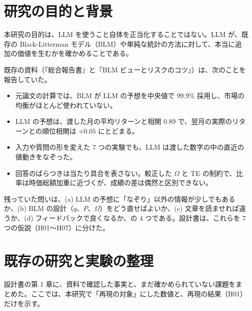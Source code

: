 \documentclass[xelatex,ja=standard,jafont=haranoaji,a4paper,10pt,openany]{bxjsreport}
\begin{document}
\setcounter{tocdepth}{1}
{\small\tableofcontents}

\chapter{研究の目的と背景}\label{ch:intro}

本研究の目的は、LLM を使うこと自体を正当化することではない。LLM が、既存の Black-Litterman モデル（BLM）や単純な統計の方法に対して、本当に追加の価値を生むかを確かめることである。

既存の資料（『総合報告書』と『BLM ビューとリスクのコツ』）は、次のことを報告していた。

\begin{itemize}
\item 元論文の計算では、BLM が LLM の予想を中央値で 99.9\% 採用し、市場の均衡がほとんど使われていない。
\item LLM の予想は、渡した月の平均リターンと相関 0.89 で、翌月の実際のリターンとの順位相関は $+0.05$ にとどまる。
\item 入力や質問の形を変えた 7 つの実験でも、LLM は渡した数字の中の直近の値動きをなぞった。
\item 回答のばらつきは当たり具合を表さない。較正した $\Omega$ と TE の制約で、比率は時価総額加重に近づくが、成績の差は偶然と区別できない。
\end{itemize}

残っていた問いは、(a) LLM の予想に「なぞり」以外の情報が少しでもあるか、(b) BLM の設計（$q$、$P$、$\Omega$）をどう直せばよいか、(c) 文章を読ませれば違うか、(d) フィードバックで良くなるか、の 4 つである。設計書は、これらを 7 つの仮説（H01〜H07）に分けた。

\chapter{既存の研究と実験の整理}\label{ch:prior}

設計書の第 1 章に、資料で確認した事実と、まだ確かめられていない課題をまとめた。ここでは、本研究で「再現の対象」にした数値と、再現の結果（H01）だけを示す。
\end{document}
